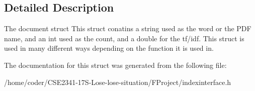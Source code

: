 \subsection{Detailed Description}
The document struct This struct conatins a string used as the word or the P\+DF name, and an int used as the count, and a double for the tf/idf. This struct is used in many different ways depending on the function it is used in. 

The documentation for this struct was generated from the following file\+:\begin{DoxyCompactItemize}
\item 
/home/coder/\+C\+S\+E2341-\/17\+S-\/\+Lose-\/lose-\/situation/\+F\+Project/indexinterface.\+h\end{DoxyCompactItemize}
